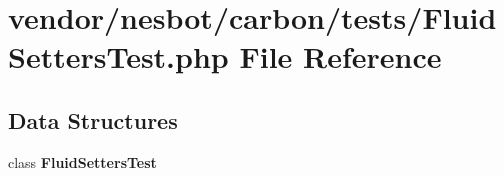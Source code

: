 \section{vendor/nesbot/carbon/tests/\+Fluid\+Setters\+Test.php File Reference}
\label{_fluid_setters_test_8php}
\subsection*{Data Structures}
\begin{DoxyCompactItemize}
\item 
class {\bf Fluid\+Setters\+Test}
\end{DoxyCompactItemize}
